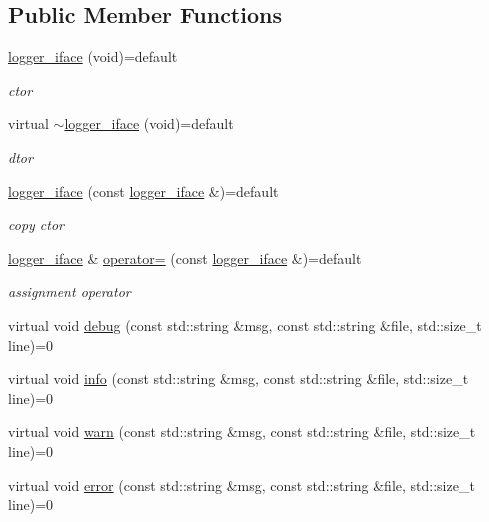 \subsection*{Public Member Functions}
\begin{DoxyCompactItemize}
\item 
\hyperlink{classcpp__redis_1_1logger__iface_a902e41bf0777b960b6575e7ac986147b}{logger\+\_\+iface} (void)=default
\begin{DoxyCompactList}\small\item\em ctor \end{DoxyCompactList}\item 
virtual \hyperlink{classcpp__redis_1_1logger__iface_ac7ed1b828afd2e6589fcdda167d34aa5}{$\sim$logger\+\_\+iface} (void)=default
\begin{DoxyCompactList}\small\item\em dtor \end{DoxyCompactList}\item 
\hyperlink{classcpp__redis_1_1logger__iface_a7f1cb271b18e40f2dde7e45028e69a84}{logger\+\_\+iface} (const \hyperlink{classcpp__redis_1_1logger__iface}{logger\+\_\+iface} \&)=default
\begin{DoxyCompactList}\small\item\em copy ctor \end{DoxyCompactList}\item 
\hyperlink{classcpp__redis_1_1logger__iface}{logger\+\_\+iface} \& \hyperlink{classcpp__redis_1_1logger__iface_a04324701cb81ba6a23f73025b0b3eee0}{operator=} (const \hyperlink{classcpp__redis_1_1logger__iface}{logger\+\_\+iface} \&)=default
\begin{DoxyCompactList}\small\item\em assignment operator \end{DoxyCompactList}\item 
virtual void \hyperlink{classcpp__redis_1_1logger__iface_aaace9e12cbb32d7bdd76c17180a30de7}{debug} (const std\+::string \&msg, const std\+::string \&file, std\+::size\+\_\+t line)=0
\item 
virtual void \hyperlink{classcpp__redis_1_1logger__iface_a02e62f55d7da56efa3b47f2b05931b3b}{info} (const std\+::string \&msg, const std\+::string \&file, std\+::size\+\_\+t line)=0
\item 
virtual void \hyperlink{classcpp__redis_1_1logger__iface_a0ea8e43a4f2118e77af56cd1cdb21cba}{warn} (const std\+::string \&msg, const std\+::string \&file, std\+::size\+\_\+t line)=0
\item 
virtual void \hyperlink{classcpp__redis_1_1logger__iface_ac8353031252c80e69e35f5f131870ddf}{error} (const std\+::string \&msg, const std\+::string \&file, std\+::size\+\_\+t line)=0
\end{DoxyCompactItemize}


